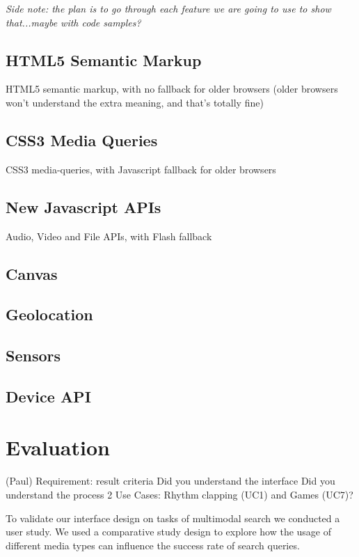 \documentclass[runningheads,a4paper]{llncs}
\begin{document}
\emph{Side note: the plan is to go through each feature we are going to use to show that...maybe with code samples?}

\subsection{HTML5 Semantic Markup} 

HTML5 semantic markup, with no fallback for older browsers (older browsers won't understand the extra meaning, and that's totally fine)

\subsection{CSS3 Media Queries} 

CSS3 media-queries, with Javascript fallback for older browsers

\subsection{New Javascript APIs}

 Audio, Video and File APIs, with Flash fallback

\subsection{Canvas}

\subsection{Geolocation}

\subsection{Sensors}

\subsection{Device API}


\section{Evaluation}
(Paul)
Requirement: result criteria
Did you understand the interface
Did you understand the process
2 Use Cases: Rhythm clapping (UC1) and Games (UC7)?

To validate our interface design on tasks of multimodal search we conducted a user study. 
We used a comparative study design to explore how the usage of different media types can 
influence the success rate of search queries. 
\end{document}
